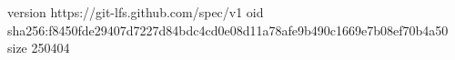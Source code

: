 version https://git-lfs.github.com/spec/v1
oid sha256:f8450fde29407d7227d84bdc4cd0e08d11a78afe9b490c1669e7b08ef70b4a50
size 250404
